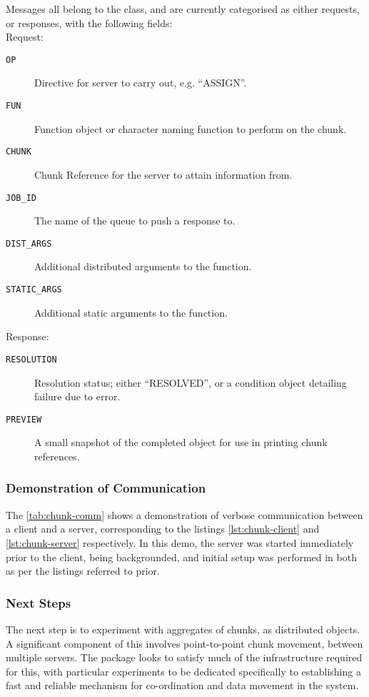 Messages all belong to the  class, and are currently categorised as either requests, or responses, with the following fields:\\

Request: \begin{description} \item[\texttt{OP}] Directive for server to carry out, e.g. ``ASSIGN''.
	\item[\texttt{FUN}] Function object or character naming function to
		perform on the chunk.
	\item[\texttt{CHUNK}] Chunk Reference for the server to attain
		information from.
	\item[\texttt{JOB\_ID}] The name of the queue to push a response to.
	\item[\texttt{DIST\_ARGS}] Additional distributed arguments to the
		function.
	\item[\texttt{STATIC\_ARGS}] Additional static arguments to the
		function.
\end{description}

Response: \begin{description} \item[\texttt{RESOLUTION}] Resolution status; either ``RESOLVED'', or a condition object detailing failure due to error.
	\item[\texttt{PREVIEW}]  A small snapshot of the completed object for
		use in printing chunk references.
\end{description}

\subsubsection{Demonstration of Communication}

The \cref{tab:chunk-comm} shows a demonstration of verbose communication between a client and a server, corresponding to the listings \cref{lst:chunk-client} and \cref{lst:chunk-server} respectively.
In this demo, the server was started immediately prior to the client, being backgrounded, and initial setup was performed in both as per the listings referred to prior.



\subsubsection{Next Steps}

The next step is to experiment with aggregates of chunks, as distributed objects.
A significant component of this involves point-to-point chunk movement, between multiple servers.
The package  looks to satisfy much of the infrastructure required for this, with particular experiments to be dedicated specifically to establishing a fast and reliable mechanism for co-ordination and data movement in the system.

